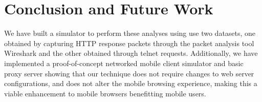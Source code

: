 \section{Conclusion and Future Work}
\label{sec:conclusion}
We have built a simulator to perform these analyses using use two datasets, one obtained by capturing HTTP response packets through the packet analysis tool Wireshark and the other obtained through telnet requests. 
Additionally, we have implemented a proof-of-concept networked mobile client simulator and basic proxy server showing that our technique does not require changes to web server configurations, and does not alter the mobile browsing experience, making this a viable enhancement to mobile browsers benefitting mobile users.
\cite{manber}



 